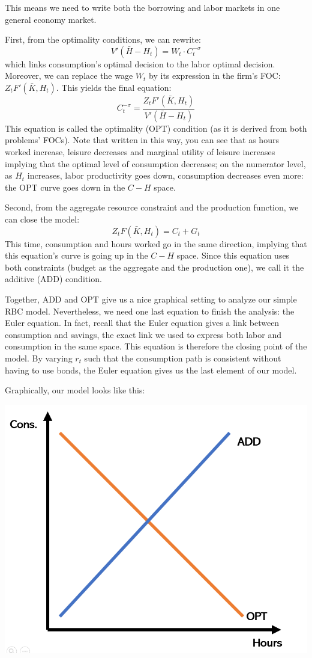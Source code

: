 \documentclass[12pt]{report}
\begin{document}
This means we need to write both the borrowing and labor markets in one general economy market. 

First, from the optimality conditions, we can rewrite: $$V'(\bar H - H_t) = W_t \cdot C_t^{-\sigma} $$ which links consumption's optimal decision to the labor optimal decision. Moreover, we can replace the wage $W_t$ by its expression in the firm's FOC: $Z_t F'(\bar K, H_t)$. This yields the final equation: $$C_t^{-\sigma} = \frac{Z_t F'(\bar K, H_t)}{V'(\bar H - H_t)}$$ This equation is called the optimality (OPT) condition (as it is derived from both problems' FOCs). Note that written in this way, you can see that as hours worked increase, leisure decreases and marginal utility of leisure increases implying that the optimal level of consumption decreases; on the numerator level, as $H_t$ increases, labor productivity goes down, consumption decreases even more: the OPT curve goes down in the $C-H$ space.

Second, from the aggregate resource constraint and the production function, we can close the model: $$Z_t F(\bar K, H_t) = C_t + G_t $$ This time, consumption and hours worked go in the same direction, implying that this equation's curve is going up in the $C-H$ space. Since this equation uses both constraints (budget as the aggregate and the production one), we call it the additive (ADD) condition.

Together, ADD and OPT give us a nice graphical setting to analyze our simple RBC model. Nevertheless, we need one last equation to finish the analysis: the Euler equation. In fact, recall that the Euler equation gives a link between consumption and savings, the exact link we used to express both labor and consumption in the same space. This equation is therefore the closing point of the model. By varying $r_t$ such that the consumption path is consistent without having to use bonds, the Euler equation gives us the last element of our model.

Graphically, our model looks like this:
\begin{center}
 \includegraphics[scale=0.40]{images/RBC1-graph.PNG}
\end{center} 
\end{document}
